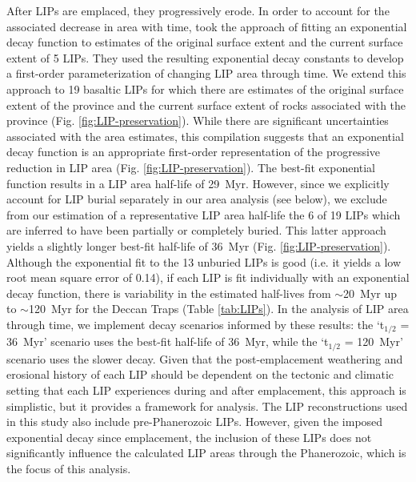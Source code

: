 After LIPs are emplaced, they progressively erode. In order to account for the associated decrease in area with time, \citet{Godderis2017a} took the approach of fitting an exponential decay function to estimates of the original surface extent and the current surface extent of 5 LIPs. They used the resulting exponential decay constants to develop a first-order parameterization of changing LIP area through time. We extend this approach to 19 basaltic LIPs for which there are estimates of the original surface extent of the province and the current surface extent of rocks associated with the province (Fig. \ref{fig:LIP-preservation}). While there are significant uncertainties associated with the area estimates, this compilation suggests that an exponential decay function is an appropriate first-order representation of the progressive reduction in LIP area (Fig. \ref{fig:LIP-preservation}). The best-fit exponential function results in a LIP area half-life of 29~Myr. However, since we explicitly account for LIP burial separately in our area analysis (see below), we exclude from our estimation of a representative LIP area half-life the 6 of 19 LIPs which are inferred to have been partially or completely buried. This latter approach yields a slightly longer best-fit half-life of 36~Myr (Fig. \ref{fig:LIP-preservation}). Although the exponential fit to the 13 unburied LIPs is good (i.e. it yields a low root mean square error of 0.14), if each LIP is fit individually with an exponential decay function, there is variability in the estimated half-lives from $\sim$20~Myr up to $\sim$120~Myr for the Deccan Traps (Table \ref{tab:LIPs}). In the analysis of LIP area through time, we implement decay scenarios informed by these results: the `t$_{1/2}$ = 36~Myr' scenario uses the best-fit half-life of 36~Myr, while the `t$_{1/2}$ = 120~Myr' scenario uses the slower decay. Given that the post-emplacement weathering and erosional history of each LIP should be dependent on the tectonic and climatic setting that each LIP experiences during and after emplacement, this approach is simplistic, but it provides a framework for analysis. The LIP reconstructions used in this study also include pre-Phanerozoic LIPs. However, given the imposed exponential decay since emplacement, the inclusion of these LIPs does not significantly influence the calculated LIP areas through the Phanerozoic, which is the focus of this analysis.

